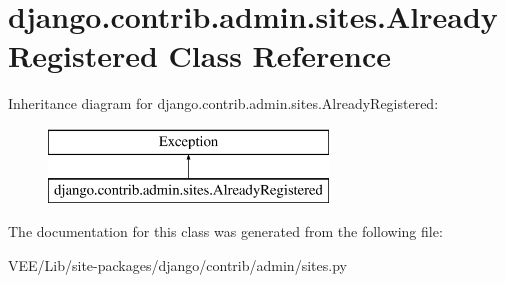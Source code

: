 \hypertarget{classdjango_1_1contrib_1_1admin_1_1sites_1_1_already_registered}{}\section{django.\+contrib.\+admin.\+sites.\+Already\+Registered Class Reference}
\label{classdjango_1_1contrib_1_1admin_1_1sites_1_1_already_registered}
Inheritance diagram for django.\+contrib.\+admin.\+sites.\+Already\+Registered\+:\begin{figure}[H]
\begin{center}
\leavevmode
\includegraphics[height=2.000000cm]{classdjango_1_1contrib_1_1admin_1_1sites_1_1_already_registered}
\end{center}
\end{figure}


The documentation for this class was generated from the following file\+:\begin{DoxyCompactItemize}
\item 
V\+E\+E/\+Lib/site-\/packages/django/contrib/admin/sites.\+py\end{DoxyCompactItemize}
